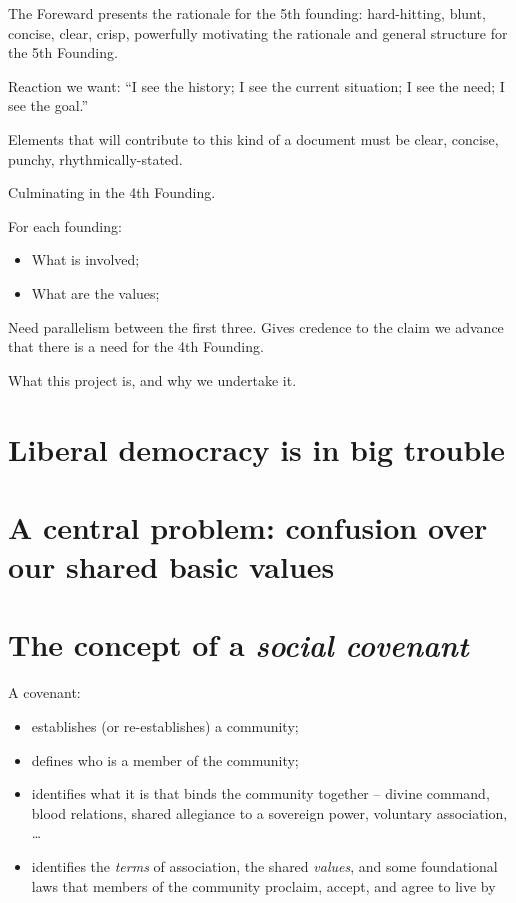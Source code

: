 \documentclass[
]{book}
\providecommand{\tightlist}{%
  \setlength{\itemsep}{0pt}\setlength{\parskip}{0pt}}
\begin{document}
The Foreward presents the rationale for the 5th founding: hard-hitting, blunt, concise, clear, crisp, powerfully motivating the rationale and general structure for the 5th Founding.

Reaction we want: ``I see the history; I see the current situation; I see the need; I see the goal.''

Elements that will contribute to this kind of a document must be clear, concise, punchy, rhythmically-stated.

Culminating in the 4th Founding.

For each founding:

\begin{itemize}
\tightlist
\item
  What is involved;
\item
  What are the values;
\end{itemize}

Need parallelism between the first three. Gives credence to the claim we advance that there is a need for the 4th Founding.

What this project is, and why we undertake it.

\hypertarget{liberal-democracy-is-in-big-trouble}{%
\section{Liberal democracy is in big trouble}\label{liberal-democracy-is-in-big-trouble}}

\hypertarget{a-central-problem-confusion-over-our-shared-basic-values}{%
\section{A central problem: confusion over our shared basic values}\label{a-central-problem-confusion-over-our-shared-basic-values}}

\hypertarget{the-concept-of-a-social-covenant}{%
\section{\texorpdfstring{The concept of a \emph{social covenant}}{The concept of a social covenant}}\label{the-concept-of-a-social-covenant}}

A covenant:

\begin{itemize}
\tightlist
\item
  establishes (or re-establishes) a community;
\item
  defines who is a member of the community;
\item
  identifies what it is that binds the community together -- divine command, blood relations, shared allegiance to a sovereign power, voluntary association, \ldots{}
\item
  identifies the \emph{terms} of association, the shared \emph{values}, and some foundational laws that members of the community proclaim, accept, and agree to live by
\end{itemize}
\end{document}
